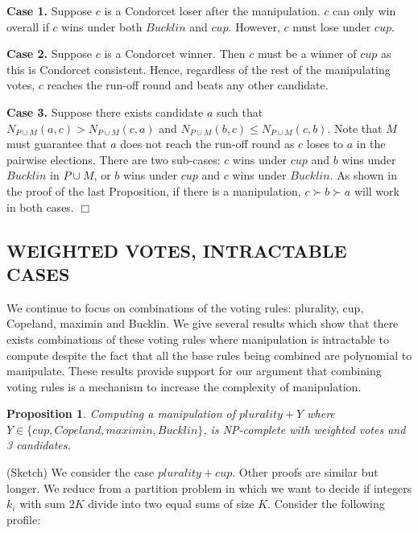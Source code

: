 \documentclass{ecai2012}
\newcommand{\winner}[2]{\mbox{$#1 + #2$}}
\newtheorem{proposition}{Proposition}
\newcommand{\myproof}{\vspace{-3mm}\noindent {\bf Proof:\ \ }}
\newcommand{\myqed}{\mbox{$\Box$}}
\begin{document}
{\bf Case 1.} Suppose $c$ is a Condorcet loser after
the manipulation. $c$ can only win overall
if $c$ wins under both  $Bucklin$ and $cup$.
However, $c$ must lose under $cup$.

{\bf Case 2.}
Suppose $c$ is a Condorcet winner.
Then $c$ must be a winner of $cup$ as this is
Condorcet consistent. Hence, regardless
of the rest of the manipulating
votes, $c$ reaches the run-off round
and beats any other candidate.

{\bf Case 3.} Suppose there exists
candidate $a$ such that
$N_{P \cup M}(a,c) > N_{P \cup M}(c,a)$ and
$N_{P \cup M}(b,c) \leq N_{P \cup M}(c,b)$.
Note that $M$ must guarantee that
$a$ does not reach the run-off round as
$c$ loses to $a$ in the pairwise elections.
There are two sub-cases: $c$ wins under $cup$
and $b$ wins  under $Bucklin$ in $P\cup M$,
or $b$ wins under $cup$
and $c$ wins  under $Bucklin$.
As shown in the proof of the last Proposition,
if there is a manipulation, $c\succ b \succ a$ will work
in both cases.
\myqed

\vspace{-1mm}
\subsection*{WEIGHTED VOTES, INTRACTABLE CASES}
\vspace{-1mm}
We continue to focus on combinations of the voting rules:
plurality, cup, Copeland, maximin and Bucklin.
We give several results which show that
there exists combinations of these voting rules where
manipulation is intractable to compute %
despite the fact that all the base rules being
combined are polynomial to
manipulate. %
These results provide support
for our argument that combining voting rules is a
mechanism to increase the %
complexity
of manipulation.

\vspace{-3mm}
\begin{proposition}
Computing a manipulation of $\winner{plurality}{Y}$ where
$Y \in \{cup, Copeland, maximin, Bucklin\}$,
is NP-complete with weighted votes and 3 candidates.
\end{proposition}
\myproof (Sketch)
We consider the case $\winner{plurality}{cup}$. Other proofs are
similar but longer.
We reduce from a  {\sc  partition} problem in which we
want to decide if integers $k_i$ with sum
$2K$ divide into two equal sums of size $K$.
Consider the following profile:
\end{document}
